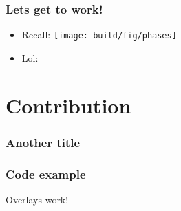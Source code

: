 \documentclass[11pt]{beamer} %
\begin{document}
  \begin{frame}
   \frametitle{Lets get to work!}
  \begin{itemize}
   \item <1-> Recall:
     \texttt{[image: build/fig/phases]}
   \item <2> Lol:
  \end{itemize}
  \end{frame}


\section{Contribution}
\begin{frame}
 \frametitle{Another title}
\end{frame}

\begin{frame}
\frametitle{Code example}
\exampleCode
\pause
Overlays work!
\end{frame}
\end{document}
